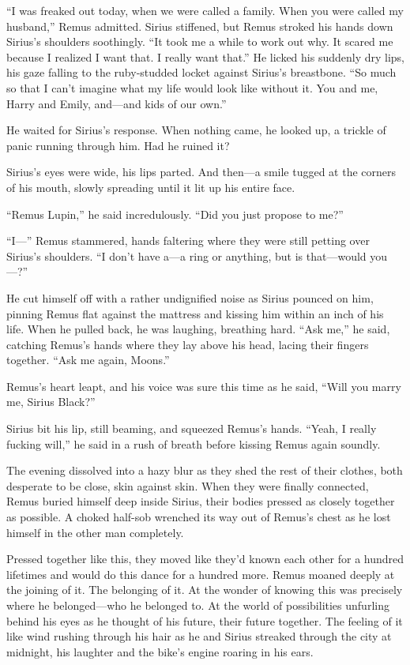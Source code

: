 “I was freaked out today, when we were called a family. When you were called my husband,” Remus admitted. Sirius stiffened, but Remus stroked his hands down Sirius’s shoulders soothingly. “It took me a while to work out why. It scared me because I realized I want that. I really want that.” He licked his suddenly dry lips, his gaze falling to the ruby-studded locket against Sirius’s breastbone. “So much so that I can’t imagine what my life would look like without it. You and me, Harry and Emily, and—and kids of our own.”

He waited for Sirius’s response. When nothing came, he looked up, a trickle of panic running through him. Had he ruined it?

Sirius’s eyes were wide, his lips parted. And then—a smile tugged at the corners of his mouth, slowly spreading until it lit up his entire face.

“Remus Lupin,” he said incredulously. “Did you just propose to me?”

“I—” Remus stammered, hands faltering where they were still petting over Sirius’s shoulders. “I don’t have a—a ring or anything, but is that—would you—?”

He cut himself off with a rather undignified noise as Sirius pounced on him, pinning Remus flat against the mattress and kissing him within an inch of his life. When he pulled back, he was laughing, breathing hard. “Ask me,” he said, catching Remus’s hands where they lay above his head, lacing their fingers together. “Ask me again, Moons.”

Remus’s heart leapt, and his voice was sure this time as he said, “Will you marry me, Sirius Black?”

Sirius bit his lip, still beaming, and squeezed Remus’s hands. “Yeah, I really fucking will,” he said in a rush of breath before kissing Remus again soundly.

The evening dissolved into a hazy blur as they shed the rest of their clothes, both desperate to be close, skin against skin. When they were finally connected, Remus buried himself deep inside Sirius, their bodies pressed as closely together as possible. A choked half-sob wrenched its way out of Remus's chest as he lost himself in the other man completely.

Pressed together like this, they moved like they’d known each other for a hundred lifetimes and would do this dance for a hundred more. Remus moaned deeply at the joining of it. The belonging of it. At the wonder of knowing this was precisely where he belonged—who he belonged to. At the world of possibilities unfurling behind his eyes as he thought of his future, their future together. The feeling of it like wind rushing through his hair as he and Sirius streaked through the city at midnight, his laughter and the bike’s engine roaring in his ears.

